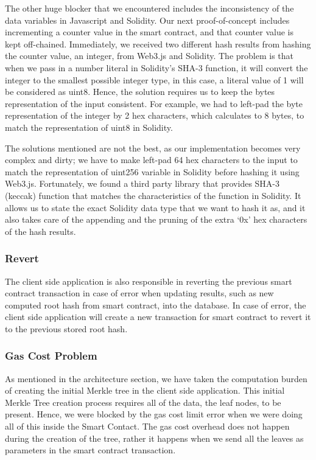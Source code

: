 The other huge blocker that we encountered includes the inconsistency of the data variables in Javascript and Solidity. Our next proof-of-concept includes incrementing a counter value in the smart contract, and that counter value is kept off-chained. Immediately, we received two different hash results from hashing the counter value, an integer, from Web3.js and Solidity. The problem is that when we pass in a number literal in Solidity’s SHA-3 function, it will convert the integer to the smallest possible integer type, in this case, a literal value of 1 will be considered as uint8. Hence, the solution requires us to keep the bytes representation of the input consistent. For example, we had to left-pad the byte representation of the integer by 2 hex characters, which calculates to 8 bytes, to match the representation of uint8 in Solidity.

The solutions mentioned are not the best, as our implementation becomes very complex and dirty; we have to make left-pad 64 hex characters to the input to match the representation of uint256 variable in Solidity before hashing it using Web3.js. Fortunately, we found a third party library that provides SHA-3 (keccak) function that matches the characteristics of the function in Solidity. \cite{web3utils} It allows us to state the exact Solidity data type that we want to hash it as, and it also takes care of the appending and the pruning of the extra ‘0x’ hex characters of the hash results.

\subsubsection*{Revert}

The client side application is also responsible in reverting the previous smart contract transaction in case of error when updating results, such as new computed root hash from smart contract, into the database. In case of error, the client side application will create a new transaction for smart contract to revert it to the previous stored root hash.

\subsubsection*{Gas Cost Problem}

As mentioned in the architecture section, we have taken the computation burden of creating the initial Merkle tree in the client side application. This initial Merkle Tree creation process requires all of the data, the leaf nodes, to be present. Hence, we were blocked by the gas cost limit error when we were doing all of this inside the Smart Contact. The gas cost overhead does not happen during the creation of the tree, rather it happens when we send all the leaves as parameters in the smart contract transaction.

